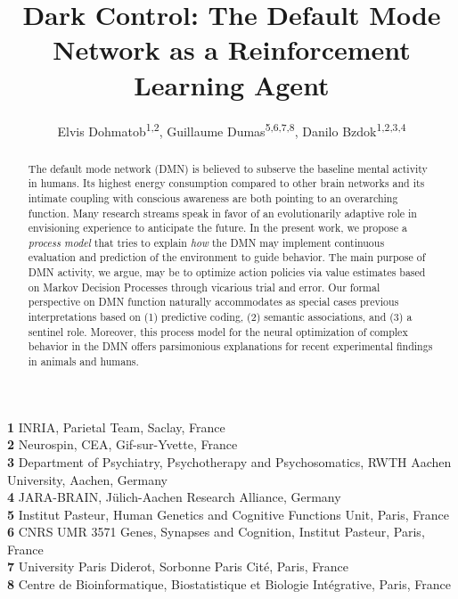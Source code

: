 \documentclass[10pt,letterpaper]{article}
\date{}
\title{Dark Control: The Default Mode Network as a Reinforcement Learning Agent}
\begin{document}
\author{Elvis Dohmatob\textsuperscript{1,2}, Guillaume Dumas\textsuperscript{5,6,7,8}, Danilo Bzdok\textsuperscript{1,2,3,4}
}

\maketitle
\small{
    \textbf{1} INRIA, Parietal Team, Saclay, France\\
    \textbf{2} Neurospin, CEA, Gif-sur-Yvette, France\\
    \textbf{3} Department of Psychiatry, Psychotherapy and Psychosomatics, RWTH Aachen University, Aachen, Germany\\
    \textbf{4} JARA-BRAIN, J\"ulich-Aachen Research Alliance, Germany\\
    \textbf{5} Institut Pasteur, Human Genetics and Cognitive Functions Unit, Paris, France\\
    \textbf{6} CNRS UMR 3571 Genes, Synapses and Cognition, Institut Pasteur, Paris, France\\
    \textbf{7} University Paris Diderot, Sorbonne Paris Cit\'e, Paris, France\\
    \textbf{8} Centre de Bioinformatique, Biostatistique et Biologie Int\'egrative, Paris, France
}

\begin{abstract}
The default mode network (DMN) is believed to subserve the
baseline mental activity in humans.
%
Its highest energy consumption compared to other brain networks and
its intimate coupling with conscious awareness are both pointing to
an overarching function.
%
Many research streams speak in favor of an evolutionarily adaptive role in
envisioning experience to anticipate the future.
In the present work, we propose a \textit{process model}
that tries to explain \textit{how}
the DMN may implement
continuous evaluation and prediction of the environment to guide behavior.
%
%
The main purpose of DMN activity, we argue,
may be to optimize action policies via value estimates
based on Markov Decision Processes through vicarious trial and error.
%
Our formal perspective on DMN function naturally accommodates as special cases
previous interpretations based on
(1) predictive coding,
(2) semantic associations, and
(3) a sentinel role.
%
Moreover, this process model for the neural optimization of complex behavior in the DMN
offers parsimonious explanations for
recent experimental findings in animals and humans.
\end{abstract}
\end{document}
